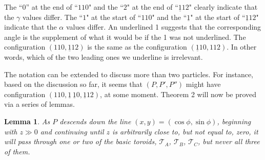 \documentclass[a4paper, twoside]{article}
\newtheorem{lemma}{Lemma}
\begin{document}
The ``$0$'' at the end of ``$110$" and the ``$2$" at the end of ``$\underline{1}12$" clearly indicate that the $\gamma$ values differ. The ``$1$" at the start of  ``$110$" and the ``$\underline{1}$" at the start of ``$\underline{1}12$" indicate that the $\alpha$ values differ. An underlined 1 suggests that the corresponding angle is the supplement of what it would be if the 1 was not underlined. The configuration $(110, \underline{1}12)$ is the same as the configuration $(\underline{1}10, 112)$. In other words, which of the two leading ones we underline is irrelevant.

The notation can be extended to discuss more than two particles. For instance, based on the discussion so far, it seems that $(P, P', P'')$ might have configuration $(110, \underline{1}\,\underline{1}0, \underline{1}12)$, at some moment. Theorem 2 will now be proved via a series of lemmas. 

\vspace{2mm}

\begin{lemma}

As $P$ descends down the line $(x, y) = (\cos\phi, \sin\phi)$, beginning with $z \gg 0$ and continuing until $z$ is arbitrarily close to, but not equal to, zero, it will pass through one or two of the basic toroids, $\mathcal{T}_A$, $\mathcal{T}_B$, $\mathcal{T}_C$, but never all three of them. 

\end{lemma}
\end{document}
